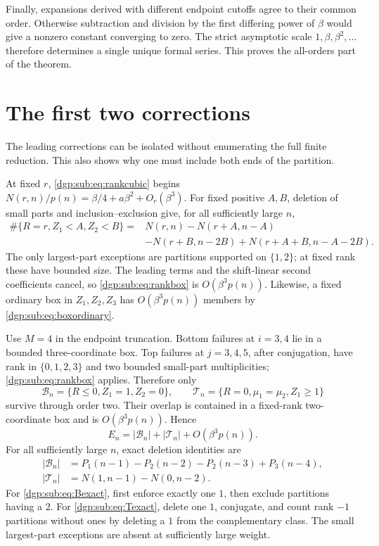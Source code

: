 \documentclass[11pt,letterpaper]{article}
\numberwithin{equation}{section}
\theoremstyle{remark}\newtheorem{remark}[theorem]{Remark}
\begin{document}
Finally, expansions derived with different endpoint cutoffs agree
to their common order. Otherwise subtraction and division by the
first differing power of $\beta$ would give a nonzero constant
converging to zero. The strict asymptotic scale
$1,\beta,\beta^2,\ldots$ therefore determines a single unique
formal series. This proves the all-orders part of the theorem.

\section{The first two corrections}\label{dgp:sub:sec:firsttwo}
The leading corrections can be isolated without enumerating the
full finite reduction. This also shows why one must include both
ends of the partition.

At fixed $r$, \eqref{dgp:sub:eq:rankcubic} begins
$N(r,n)/p(n)=\beta/4+a\beta^2+O_r(\beta^3)$.
For fixed positive $A,B$, deletion of small parts and
inclusion--exclusion give, for all sufficiently large $n$,
\begin{align}\label{dgp:sub:eq:rankbox}
 \#\{R=r,Z_1<A,Z_2<B\}={}&N(r,n)-N(r+A,n-A)\nonumber\\
 &-N(r+B,n-2B)+N(r+A+B,n-A-2B).
\end{align}
The only largest-part exceptions are partitions supported on
$\{1,2\}$; at fixed rank these have bounded size.
The leading terms and the shift-linear second coefficients cancel,
so \eqref{dgp:sub:eq:rankbox} is $O(\beta^3p(n))$.
Likewise, a fixed ordinary box in $Z_1,Z_2,Z_3$ has
$O(\beta^3p(n))$ members by \eqref{dgp:sub:eq:boxordinary}.

Use $M=4$ in the endpoint truncation. Bottom failures at $i=3,4$
lie in a bounded three-coordinate box. Top failures at $j=3,4,5$,
after conjugation, have rank in $\{0,1,2,3\}$ and two bounded
small-part multiplicities; \eqref{dgp:sub:eq:rankbox} applies. Therefore only
\[
 \mathcal B_n=\{R\leq0,Z_1=1,Z_2=0\},\qquad
 \mathcal T_n=\{R=0,\mu_1=\mu_2,Z_1\geq1\}
\]
survive through order two. Their overlap is contained in a fixed-rank
two-coordinate box and is $O(\beta^3p(n))$. Hence
\begin{equation}\label{dgp:sub:eq:Esecond}
 E_n=|\mathcal B_n|+|\mathcal T_n|+O(\beta^3p(n)).
\end{equation}
For all sufficiently large $n$, exact deletion identities are
\begin{align}
 |\mathcal B_n|&=P_1(n-1)-P_2(n-2)-P_2(n-3)+P_3(n-4),\label{dgp:sub:eq:Bexact}\\
 |\mathcal T_n|&=N(1,n-1)-N(0,n-2).\label{dgp:sub:eq:Texact}
\end{align}
For \eqref{dgp:sub:eq:Bexact}, first enforce exactly one $1$, then exclude
partitions having a $2$. For \eqref{dgp:sub:eq:Texact}, delete one $1$,
conjugate, and count rank $-1$ partitions without ones by deleting
a $1$ from the complementary class. The small largest-part
exceptions are absent at sufficiently large weight.
\end{document}
